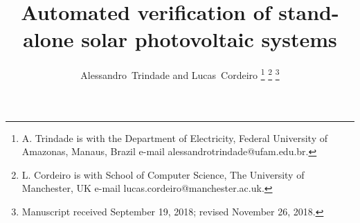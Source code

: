 \documentclass[journal]{IEEEtran}
\begin{document}
%
\title{Automated verification of stand-alone solar photovoltaic systems}
%
%
%

\author{Alessandro~Trindade and Lucas~Cordeiro%
\thanks{A. Trindade is with the Department of Electricity, Federal University of Amazonas, Manaus, Brazil e-mail alessandrotrindade@ufam.edu.br.}%
\thanks{L. Cordeiro is with School of Computer Science, The University of Manchester, UK e-mail lucas.cordeiro@manchester.ac.uk.}%
\thanks{Manuscript received September 19, 2018; revised November 26, 2018.}}

% 
%
\end{document}
